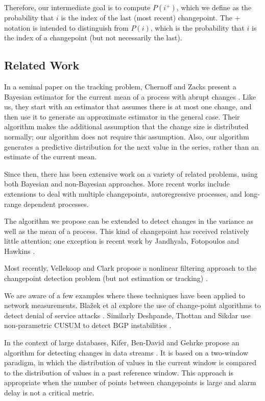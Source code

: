 \documentclass[twocolumn,11pt]{article}
\begin{document}
Therefore, our intermediate goal is to compute
$P(i^+)$, which we define as the probability that $i$ is the index
of the last (most recent) changepoint.  The $+$ notation is intended
to distinguish from $P(i)$, which is the probability that $i$
is the index of a changepoint (but not necessarily the last).


\subsection{Related Work}

In a seminal paper on the tracking problem, Chernoff and Zacks present
a Bayesian estimator for the current mean of a process with abrupt changes
\cite{chernoff64estimating}.
Like us, they start with an estimator that assumes there is at most
one change, and then use it to generate an approximate estimator in
the general case.  Their algorithm makes the additional assumption
that the change size is distributed normally; our algorithm does not
require this assumption.  Also, our algorithm generates a predictive
distribution for the next value in the series, rather than an estimate
of the current mean.

Since then, there has been extensive work on a variety of related
problems, using both Bayesian and non-Bayesian approaches.  More
recent works include extensions to deal with multiple changepoints,
autoregressive processes, and long-range dependent processes.

The algorithm we propose can be extended to detect changes in the
variance as well as the mean of a process.  This kind of changepoint
has received relatively little attention; one exception is recent
work by Jandhyala, Fotopoulos and Hawkins \cite{jandhyala02detection}.

Most recently, Vellekoop and Clark propose a nonlinear filtering
approach to the changepoint detection problem (but not estimation
or tracking) \cite{vellekoop06nonlinear}.

We are aware of a few examples where these techniques have been
applied to network measurements.  Bla\v{z}ek et al explore the use of
change-point algorithms to detect denial of service attacks
\cite{blazek01novel}.  Similarly Deshpande, Thottan and Sikdar use
non-parametric CUSUM to detect BGP instabilities
\cite{deshpande04early}.

In the context of large databases, Kifer, Ben-David and Gehrke propose
an algorithm for detecting changes in data streams
\cite{kifer04detecting}.  It is based on a two-window paradigm, in
which the distribution of values in the current window is compared to
the distribution of values in a past reference window.  This approach
is appropriate when the number of points between changepoints is
large and alarm delay is not a critical metric.
\end{document}
